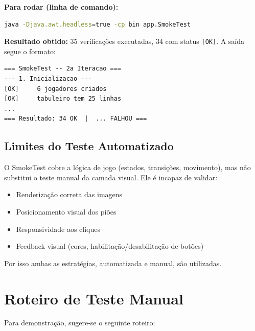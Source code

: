 \documentclass[12pt,a4paper]{report}
\begin{document}
\textbf{Para rodar (linha de comando):}
\begin{lstlisting}[language=bash]
java -Djava.awt.headless=true -cp bin app.SmokeTest
\end{lstlisting}

\textbf{Resultado obtido:} 35 verificações executadas, 34 com status \texttt{[OK]}. A saída segue o formato:
\begin{lstlisting}
=== SmokeTest -- 2a Iteracao ===
--- 1. Inicializacao ---
[OK]     6 jogadores criados
[OK]     tabuleiro tem 25 linhas
...
=== Resultado: 34 OK  |  ... FALHOU ===
\end{lstlisting}

\subsection{Limites do Teste Automatizado}

O SmokeTest cobre a lógica de jogo (estados, transições, movimento), mas não substitui o teste manual da camada visual. Ele é incapaz de validar:
\begin{itemize}
    \item Renderização correta das imagens
    \item Posicionamento visual dos piões
    \item Responsividade aos cliques
    \item Feedback visual (cores, habilitação/desabilitação de botões)
\end{itemize}

Por isso ambas as estratégias, automatizada e manual, são utilizadas.

\section{Roteiro de Teste Manual}

Para demonstração, sugere-se o seguinte roteiro:
\end{document}
